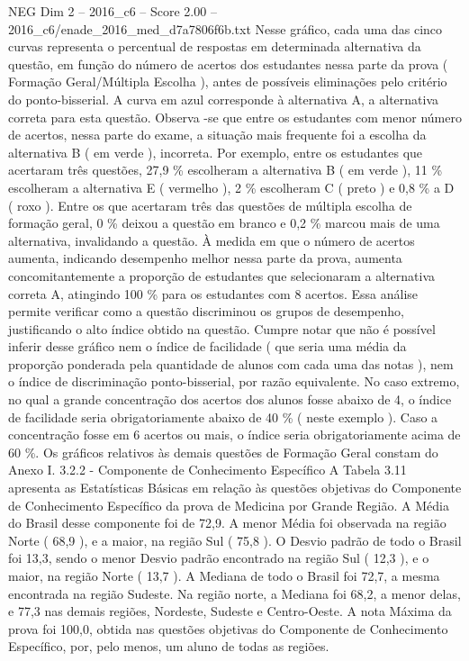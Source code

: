 \begin{textsample}{NEG Dim 2 – 2016\_c6 – Score 2.00 – 2016\_c6/enade\_2016\_med\_d7a7806f6b.txt}
Nesse gráfico, cada uma das cinco curvas representa o percentual de respostas em determinada alternativa da questão, em função do número de acertos dos estudantes nessa parte da prova ( Formação Geral/Múltipla Escolha ), antes de possíveis eliminações pelo critério do ponto-bisserial.
A curva em azul corresponde à alternativa A, a alternativa correta para esta questão.
Observa -se que entre os estudantes com menor número de acertos, nessa parte do exame, a situação mais frequente foi a escolha da alternativa B ( em verde ), incorreta.
Por exemplo, entre os estudantes que acertaram três questões, 27,9 \% escolheram a alternativa B ( em verde ), 11 \% escolheram a alternativa E ( vermelho ), 2 \% escolheram C ( preto ) e 0,8 \% a D ( roxo ).
Entre os que acertaram três das questões de múltipla escolha de formação geral, 0 \% deixou a questão em branco e 0,2 \% marcou mais de uma alternativa, invalidando a questão.
À medida em que o número de acertos aumenta, indicando desempenho melhor nessa parte da prova, aumenta concomitantemente a proporção de estudantes que selecionaram a alternativa correta A, atingindo 100 \% para os estudantes com 8 acertos.
Essa análise permite verificar como a questão discriminou os grupos de desempenho, justificando o alto índice obtido na questão.
Cumpre notar que não é possível inferir desse gráfico nem o índice de facilidade ( que seria uma média da proporção ponderada pela quantidade de alunos com cada uma das notas ), nem o índice de discriminação ponto-bisserial, por razão equivalente.
No caso extremo, no qual a grande concentração dos acertos dos alunos fosse abaixo de 4, o índice de facilidade seria obrigatoriamente abaixo de 40 \% ( neste exemplo ).
Caso a concentração fosse em 6 acertos ou mais, o índice seria obrigatoriamente acima de 60 \%.
Os gráficos relativos às demais questões de Formação Geral constam do Anexo I. 3.2.2 - Componente de Conhecimento Específico A Tabela 3.11 apresenta as Estatísticas Básicas em relação às questões objetivas do Componente de Conhecimento Específico da prova de Medicina por Grande Região.
A Média do Brasil desse componente foi de 72,9.
A menor Média foi observada na região Norte ( 68,9 ), e a maior, na região Sul ( 75,8 ).
O Desvio padrão de todo o Brasil foi 13,3, sendo o menor Desvio padrão encontrado na região Sul ( 12,3 ), e o maior, na região Norte ( 13,7 ).
A Mediana de todo o Brasil foi 72,7, a mesma encontrada na região Sudeste.
Na região norte, a Mediana foi 68,2, a menor delas, e 77,3 nas demais regiões, Nordeste, Sudeste e Centro-Oeste.
A nota Máxima da prova foi 100,0, obtida nas questões objetivas do Componente de Conhecimento Específico, por, pelo menos, um aluno de todas as regiões.

\end{textsample}
